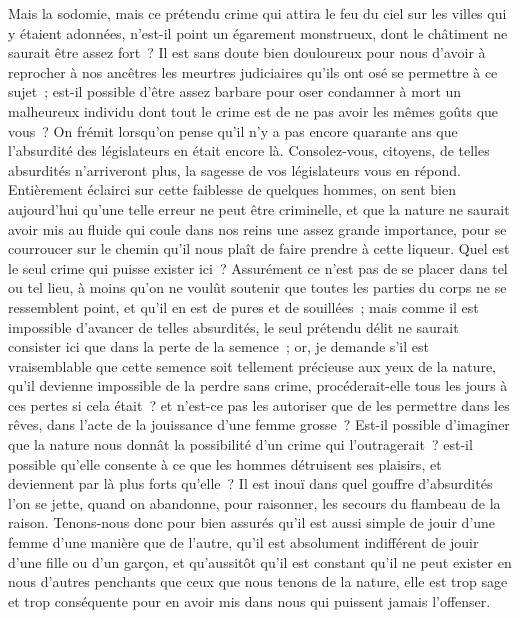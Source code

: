 \documentclass[french,twoside]{book} %
\begin{document}
Mais la sodomie, mais ce prétendu crime qui attira le feu du ciel sur les villes qui y étaient adonnées, n’est-il point un égarement monstrueux, dont le châtiment ne saurait être assez fort ? Il est sans doute bien douloureux pour nous d’avoir à reprocher à nos ancêtres les meurtres judiciaires qu’ils ont osé se permettre à ce sujet ; est-il possible d’être assez barbare pour oser condamner à mort un malheureux individu dont tout le crime est de ne pas avoir les mêmes goûts que vous ? On frémit lorsqu’on pense qu’il n’y a pas encore quarante ans que l’absurdité des législateurs en était encore là. Consolez-vous, citoyens, de telles absurdités n’arriveront plus, la sagesse de vos législateurs vous en répond. Entièrement éclairci sur cette faiblesse de quelques hommes, on sent bien aujourd’hui qu’une telle erreur ne peut être criminelle, et que la nature ne saurait avoir mis au fluide qui coule dans nos reins une assez grande importance, pour se courroucer sur le chemin qu’il nous plaît de faire prendre à cette liqueur. Quel est le seul crime qui puisse exister ici ? Assurément ce n’est pas de se placer dans tel ou tel lieu, à moins qu’on ne voulût soutenir que toutes les parties du corps ne se ressemblent point, et qu’il en est de pures et de souillées ; mais comme il est impossible d’avancer de telles absurdités, le seul prétendu délit ne saurait consister ici que dans la perte de la semence ; or, je demande s’il est vraisemblable que cette semence soit tellement précieuse aux yeux de la nature, qu’il devienne impossible de la perdre sans crime, procéderait-elle tous les jours à ces pertes si cela était ? et n’est-ce pas les autoriser que de les permettre dans les rêves, dans l’acte de la jouissance d’une femme grosse ? Est-il possible d’imaginer que la nature nous donnât la possibilité d’un crime qui l’outragerait ? est-il possible qu’elle consente à ce que les hommes détruisent ses plaisirs, et deviennent par là plus forts qu’elle ? Il est inouï dans quel gouffre d’absurdités l’on se jette, quand on abandonne, pour raisonner, les secours du flambeau de la raison. Tenons-nous donc pour bien assurés qu’il est aussi simple de jouir d’une femme d’une manière que de l’autre, qu’il est absolument indifférent de jouir d’une fille ou d’un garçon, et qu’aussitôt qu’il est constant qu’il ne peut exister en nous d’autres penchants que ceux que nous tenons de la nature, elle est trop sage et trop conséquente pour en avoir mis dans nous qui puissent jamais l’offenser.\par
\end{document}
